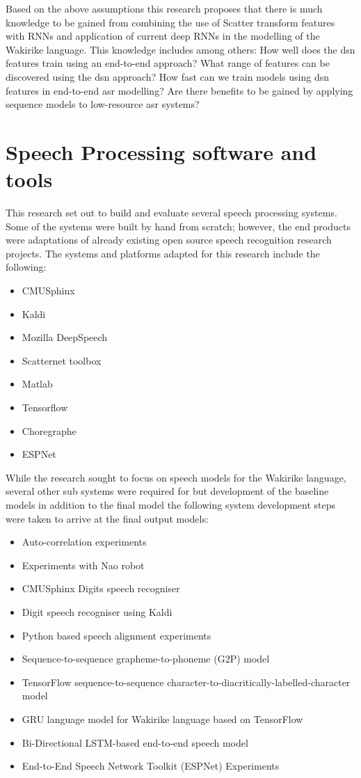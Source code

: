 Based on the above assumptions this research proposes that there is much knowledge to be gained from combining the use of Scatter transform features with RNNs and application of current deep RNNs in the modelling of the Wakirike language. \startblue This knowledge includes among others:
How well does the \acrshort{dsn} features train using an end-to-end approach?
What range of features can be discovered using the \acrshort{dsn} approach?
How fast can we train models using \acrshort{dsn} features in end-to-end \acrshort{asr} modelling?
Are there benefits to be gained by applying sequence models to low-resource \acrshort{asr} systems?
\stopblue

\section{Speech Processing software and tools}
This research set out to build and evaluate several speech processing systems.  Some of the systems were built by hand from scratch; however, the end products were adaptations of already existing open source speech recognition research projects.  The systems and platforms adapted for this research include the following:
\begin{itemize}
    \item CMUSphinx
    \item Kaldi
    \item Mozilla DeepSpeech
    \item Scatternet toolbox
    \item Matlab
    \item Tensorflow
    \item Choregraphe
    \item ESPNet
\end{itemize}

While the research sought to focus on speech models for the Wakirike language, several other sub systems were required for but development of the baseline models in addition to the final model the following system development steps were taken to arrive at the final output models:
\begin{itemize}
    \item Auto-correlation experiments
    \item Experiments with Nao robot
    \item CMUSphinx Digits speech recogniser
    \item Digit speech recogniser using Kaldi
    \item Python based speech alignment experiments
    \item Sequence-to-sequence grapheme-to-phoneme (G2P) model
    \item TensorFlow sequence-to-sequence character-to-diacritically-labelled-character model
    \item GRU language model for Wakirike language based on TensorFlow
    \item Bi-Directional LSTM-based end-to-end speech model
    \item End-to-End Speech Network Toolkit (ESPNet) Experiments

\end{itemize}

